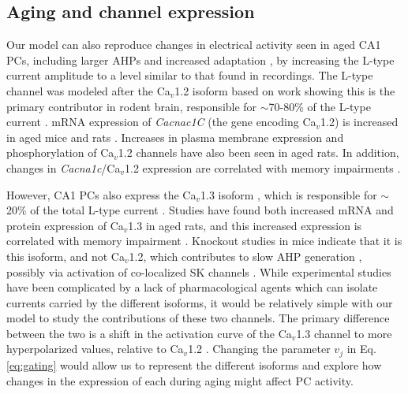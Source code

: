 \documentclass[12pt]{article}
\begin{document}
\subsection{Aging and {\Ca} channel expression}
Our model can also reproduce changes in electrical activity seen in aged CA1 PCs, including larger AHPs \citep{landfield1984prolonged,gant2009action,power2002age} and increased adaptation \citep{gant2006early,moyer1992nimodipine,tombaugh2005slow}, by increasing the L-type {\Ca} current amplitude 
to a level similar to that found in recordings. The L-type channel was modeled after the Ca$_v$1.2 isoform based on work showing this is the primary contributor in rodent brain, responsible for $\sim$70-80\% of the L-type current \cite{hell1993identification,sinnegger2004isoform}. mRNA expression of \textit{Cacnac1C} (the gene encoding Ca$_v$1.2) is increased in aged mice and rats \cite{herman1998up,zanos2015sex}. Increases in plasma membrane expression \cite{nunez2014surface} and phosphorylation \cite{davare2003increased} of Ca$_v$1.2 channels have also been seen in aged rats. In addition, changes in \textit{Cacna1c}/Ca$_v$1.2 expression are correlated with memory impairments \cite{moosmang2005role,zanos2015sex}.

However, CA1 PCs also express the Ca$_v$1.3 isoform \cite{bowden2001somatic}, which is responsible for $\sim$20\% of the total L-type current \cite{hell1993identification,sinnegger2004isoform}. Studies have found both increased mRNA \cite{herman1998up} and protein \cite{veng2002regionally} expression of Ca$_v$1.3 in aged rats, and this increased expression is correlated with memory impairment \cite{veng2003age}. Knockout studies in mice indicate that it is this isoform, and not Ca$_v$1.2, which contributes to slow AHP generation \citep{gamelli2011deletion}, possibly via activation of co-localized SK channels \cite{bowden2001somatic}. While experimental studies have been complicated by a lack of pharmacological agents which can isolate currents carried by the different isoforms, it would be relatively simple with our model to study the contributions of these two channels. The primary difference between the two is a shift in the activation curve of the Ca$_v$1.3 channel to more hyperpolarized values, relative to Ca$_v$1.2 \citep{xu2001neuronal}. Changing the parameter $v_j$ in Eq. \ref{eq:gating} would allow us to represent the different isoforms and explore how changes in the expression of each during aging might affect PC activity.  
\end{document}
